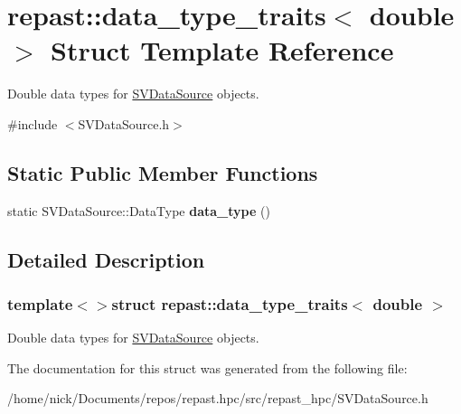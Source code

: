 \hypertarget{structrepast_1_1data__type__traits_3_01double_01_4}{\section{repast\-:\-:data\-\_\-type\-\_\-traits$<$ double $>$ Struct Template Reference}
\label{structrepast_1_1data__type__traits_3_01double_01_4}
}


Double data types for \hyperlink{classrepast_1_1_s_v_data_source}{S\-V\-Data\-Source} objects.  




{\ttfamily \#include $<$S\-V\-Data\-Source.\-h$>$}

\subsection*{Static Public Member Functions}
\begin{DoxyCompactItemize}
\item 
\hypertarget{structrepast_1_1data__type__traits_3_01double_01_4_a396c5e415a3b8b2ce0732860237e3d61}{static S\-V\-Data\-Source\-::\-Data\-Type {\bfseries data\-\_\-type} ()}\label{structrepast_1_1data__type__traits_3_01double_01_4_a396c5e415a3b8b2ce0732860237e3d61}

\end{DoxyCompactItemize}


\subsection{Detailed Description}
\subsubsection*{template$<$$>$struct repast\-::data\-\_\-type\-\_\-traits$<$ double $>$}

Double data types for \hyperlink{classrepast_1_1_s_v_data_source}{S\-V\-Data\-Source} objects. 

The documentation for this struct was generated from the following file\-:\begin{DoxyCompactItemize}
\item 
/home/nick/\-Documents/repos/repast.\-hpc/src/repast\-\_\-hpc/S\-V\-Data\-Source.\-h\end{DoxyCompactItemize}
